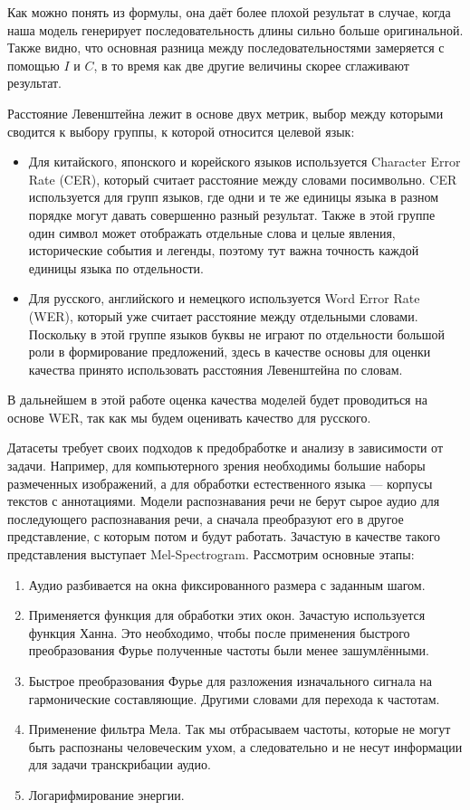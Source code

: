 Как можно понять из формулы, она даёт более плохой результат в случае, когда наша модель генерирует последовательность длины сильно больше оригинальной.
Также видно, что основная разница между последовательностями замеряется с помощью $I$ и $C$, в то время как две другие величины скорее сглаживают результат.


Расстояние Левенштейна лежит в основе двух метрик, выбор между которыми сводится к выбору группы, к которой относится целевой язык:
\begin{itemize}
  \item Для китайского, японского и корейского языков используется Character Error Rate (CER), который считает расстояние между словами посимвольно.
  CER используется для групп языков, где одни и те же единицы языка в разном порядке могут давать совершенно разный результат.
  Также в этой группе один символ может отображать отдельные слова и целые явления, исторические события и легенды, поэтому тут важна точность каждой единицы языка по отдельности.
  \item Для русского, английского и немецкого используется Word Error Rate (WER), который уже считает расстояние между отдельными словами.
  Поскольку в этой группе языков буквы не играют по отдельности большой роли в формирование предложений, здесь в качестве основы для оценки качества принято использовать расстояния Левенштейна по словам.
\end{itemize}

В дальнейшем в этой работе оценка качества моделей будет проводиться на основе WER, так как мы будем оценивать качество для русского.

Датасеты требует своих подходов к предобработке и анализу в зависимости от задачи.
Например, для компьютерного зрения необходимы большие наборы размеченных изображений, а для обработки естественного языка — корпусы текстов с аннотациями.
Модели распознавания речи не берут сырое аудио для последующего распознавания речи, а сначала преобразуют его в другое представление, с которым потом и будут работать.
Зачастую в качестве такого представления выступает Mel-Spectrogram.
Рассмотрим основные этапы:
\begin{enumerate}
  \item Аудио разбивается на окна фиксированного размера с заданным шагом.
  \item Применяется функция для обработки этих окон.
  Зачастую используется функция Ханна.
  Это необходимо, чтобы после применения быстрого преобразования Фурье полученные частоты были менее зашумлёнными.
  \item Быстрое преобразования Фурье для разложения изначального сигнала на гармонические составляющие.
  Другими словами для перехода к частотам.
  \item Применение фильтра Мела.
  Так мы отбрасываем частоты, которые не могут быть распознаны человеческим ухом, а следовательно и не несут информации для задачи транскрибации аудио.
  \item Логарифмирование энергии.
\end{enumerate}

